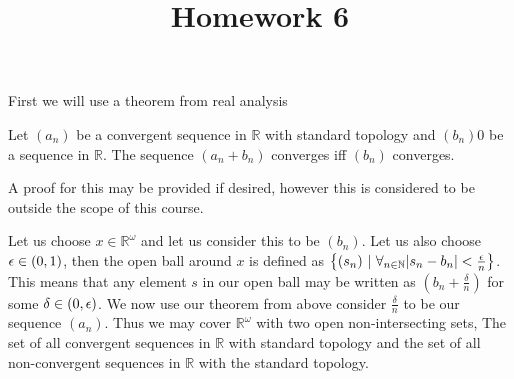 \documentclass{article}
\title{Homework 6}
\begin{document}
\maketitle

 First we will use a theorem from real analysis

\begin{theorem}
	Let $(a_n)$ be a convergent sequence in $\mathbb R$ with standard topology and $(b_n)0$ be a sequence in $\mathbb R$. The sequence $(a_n+b_n)$ converges iff $(b_n)$ converges.
\end{theorem}

A proof for this may be provided if desired, however this is considered to be outside the scope of this course.

Let us choose $x\in\mathbb R^\omega$ and let us consider this to be $(b_n)$. Let us also choose $\epsilon\in\left( {0} , {1} \right)$, then the open ball around $x$ is defined as $\left\{{(s_n)} \ |\  {\forall_{n\in\mathbb N} {\left|{s_n-b_n}\right| < \frac\epsilon n} }\right\}$. This means that any element $s$ in our open ball may be written as $\left( b_n + \frac\delta n \right)$ for some $\delta \in \left( {0} , {\epsilon} \right)$. We now use our theorem from above consider $\frac\delta n$ to be our sequence $(a_n)$. Thus we may cover $\mathbb R^\omega$ with two open non-intersecting sets, The set of all convergent sequences in $\mathbb R$ with standard topology and the set of all non-convergent sequences in $\mathbb R$ with the standard topology.

\end{document}

